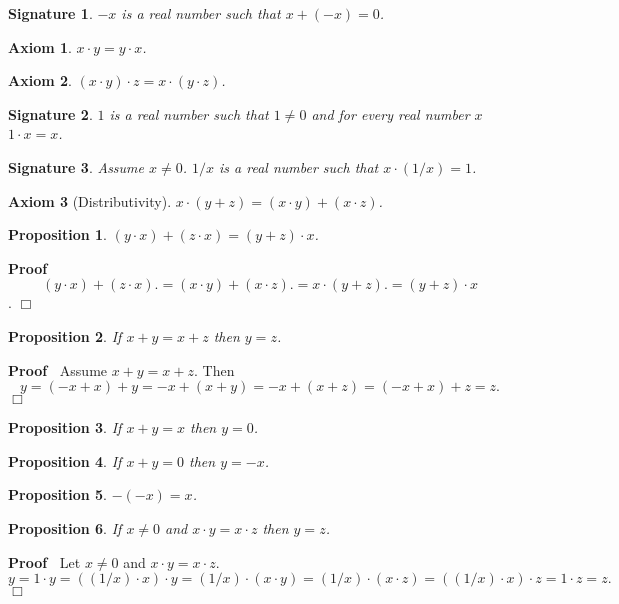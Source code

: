 \documentclass{article}
\newenvironment{forthel}{\begin{leftbar}}{\end{leftbar}}
\newenvironment{proof}{\noindent\textbf{Proof\ }}{\hspace*{\fill}$\Box$\medskip}
\newtheorem{axiom}{Axiom}
\newtheorem{signature}{Signature}
\newtheorem{proposition}{Proposition}
\begin{document}
\begin{forthel}
\begin{signature} $-x$ is a real number such that $x + (-x) = 0$.
\end{signature}

\begin{axiom} $x \cdot y = y \cdot x$.\end{axiom}

\begin{axiom} $(x \cdot y) \cdot z = x \cdot (y \cdot z)$.
\end{axiom}

\begin{signature} $1$ is a real number such that $1 \neq 0$ and 
for every real number $x$ $1 \cdot x = x$.\end{signature}

\begin{signature} Assume $x \neq 0$. $1/x$ is a real number
such that $x \cdot (1/x) = 1$.\end{signature}

\begin{axiom}[Distributivity] $x \cdot (y + z) = (x \cdot y) + (x \cdot z)$.
\end{axiom}
\begin{proposition} $(y \cdot x) + (z \cdot x) = (y + z) \cdot x$.
\end{proposition}
\begin{proof}
$$(y \cdot x) + (z \cdot x) .= 
(x \cdot y) + (x \cdot z) .=
x \cdot (y + z).=
(y + z) \cdot x$$.
\end{proof}

\begin{proposition} If $x + y = x + z$ then $y = z$.
\end{proposition}
\begin{proof} Assume $x + y = x + z$. Then 
$$y = (-x+x) + y = -x + (x+y) = -x + (x+z) = (-x+x) + z = z.$$
\end{proof}

\begin{proposition} If $x + y = x$ then $y = 0$.\end{proposition}
\begin{proposition} If $x + y = 0$ then $y = -x$.\end{proposition}
\begin{proposition} $-(-x) = x$.\end{proposition}


\begin{proposition} If $x \neq 0$ and $x \cdot y = x \cdot z$ 
then $y = z$. \end{proposition}
\begin{proof} Let $x \neq 0$ and $x \cdot y = x \cdot z$.
$$y = 1 \cdot y = ((1/x) \cdot x) \cdot y = (1/x) \cdot (x \cdot y) =
(1/x) \cdot (x \cdot z) = ((1/x) \cdot x) \cdot z = 1 \cdot z = z.$$
\end{proof}


\end{forthel}
\end{document}
